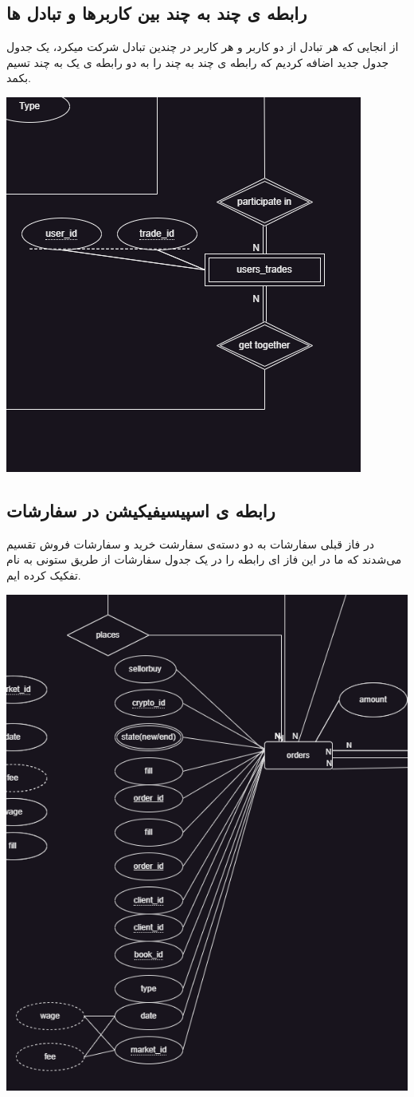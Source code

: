 \documentclass{book}
\begin{document}
\subsection{رابطه ی چند به چند بین کاربرها و تبادل ها}
از انجایی که هر تبادل از دو کاربر و هر کاربر در چندین تبادل شرکت میکرد، یک جدول جدول جدید اضافه کردیم که رابطه ی چند به چند را به دو رابطه ی یک به چند تسیم بکمد.

\includegraphics[width=0.8\linewidth]{users_trades.png}
\newpage

\subsection{رابطه ی اسپیسیفیکیشن در سفارشات}
در فاز قبلی سفارشات به دو دسته‌ی سفارشت خرید و سفارشات فروش تقسیم می‌شدند که ما در این فاز ای رابطه را در یک جدول سفارشات از طریق ستونی به نام  تفکیک کرده ایم.

\includegraphics[width=0.8\linewidth]{orders.png}
\newpage
\end{document}
